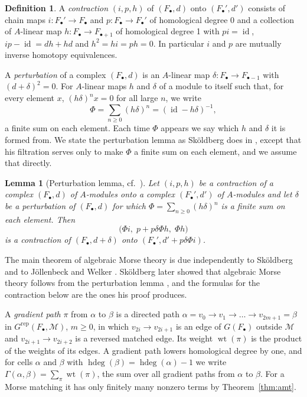 \documentclass[12pt]{amsart}
\theoremstyle{plain}
\newtheorem{lemma}[theorem]{Lemma}
\theoremstyle{definition}
\newtheorem{definition}[theorem]{Definition}
\newcommand{\F}{ {F_\bullet} }
\newcommand{\M}{\mathcal{M}}
\newcommand{\Grep}{G^{\mathrm{rep}}}
\newcommand{\id}{\operatorname{id}}
\newcommand{\hdeg}{\operatorname{hdeg}}
\newcommand{\wt}{\operatorname{wt}}
\begin{document}
\begin{definition}\label{def:contraction}
    A \emph{contraction} $(i, p, h)$ of $(\F, d)$ onto $(\F', d')$ consists of chain maps $i \colon \F' \to \F$ and $p \colon \F \to \F'$ of homological degree $0$ and a collection of $A$-linear map $h \colon F_\bullet \to F_{\bullet+1}$ of homological degree 1 with $pi = \id$, $ip - \id = dh + hd$ and $h^2 = hi = ph = 0$. In particular $i$ and $p$ are mutually inverse homotopy equivalences.
\end{definition}

A \emph{perturbation} of a complex $(\F, d)$ is an $A$-linear map $\delta \colon F_\bullet \to F_{\bullet-1}$ with $(d + \delta)^2 = 0$. For $A$-linear maps $h$ and $\delta$ of a module to itself such that, for every element $x$, $(h\delta)^n x = 0$ for all large $n$, we write
\[
    \Phi = \sum_{n \ge 0} (h\delta)^n = (\id - h\delta)^{-1},
\]
a finite sum on each element. Each time $\Phi$ appears we say which $h$ and $\delta$ it is formed from. We state the perturbation lemma as Sk\"oldberg does in \cite[Theorem~1]{SkoldbergHPT}, except that his filtration serves only to make $\Phi$ a finite sum on each element, and we assume that directly.

\begin{lemma}[Perturbation lemma, cf.~{\cite[Theorem~1]{SkoldbergHPT}}]\label{lem:perturbation}
    Let $(i, p, h)$ be a contraction of a complex $(\F, d)$ of $A$-modules onto a complex $(\F', d')$ of $A$-modules and let $\delta$ be a perturbation of $(\F, d)$ for which $\Phi = \sum_{n \ge 0} (h\delta)^n$ is a finite sum on each element. Then
    \[
        \bigl( \Phi i, \; p + p \delta \Phi h, \; \Phi h \bigr)
    \]
    is a contraction of $(\F, d + \delta)$ onto $(\F', d' + p \delta \Phi i)$.
\end{lemma}

The main theorem of algebraic Morse theory is due independently to Sk\"oldberg \cite{Skoldberg} and to J\"ollenbeck and Welker \cite[Theorem~2.2]{JollenbeckWelker}. Sk\"oldberg later showed that algebraic Morse theory follows from the perturbation lemma \cite[Theorem~2]{SkoldbergHPT}, and the formulas for the contraction below are the ones his proof produces.

A \emph{gradient path} $\pi$ from $\alpha$ to $\beta$ is a directed path $\alpha = v_0 \to v_1 \to \dots \to v_{2m+1} = \beta$ in $\Grep(\F, \M)$, $m \ge 0$, in which $v_{2i} \to v_{2i+1}$ is an edge of $G(\F)$ outside $\M$ and $v_{2i+1} \to v_{2i+2}$ is a reversed matched edge. Its weight $\wt(\pi)$ is the product of the weights of its edges. A gradient path lowers homological degree by one, and for cells $\alpha$ and $\beta$ with $\hdeg(\beta) = \hdeg(\alpha) - 1$ we write $\Gamma(\alpha, \beta) = \sum_\pi \wt(\pi)$, the sum over all gradient paths from $\alpha$ to $\beta$. For a Morse matching it has only finitely many nonzero terms by Theorem~\ref{thm:amt}.
\end{document}
